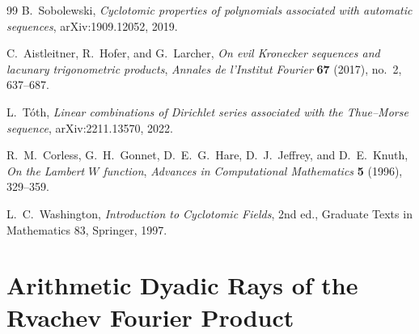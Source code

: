 \documentclass[11pt,oneside]{article}
\theoremstyle{definition}
\theoremstyle{remark}
\begin{document}
\begin{thebibliography}{99}
B.~Sobolewski,
\emph{Cyclotomic properties of polynomials associated with automatic sequences},
arXiv:1909.12052, 2019.

C.~Aistleitner, R.~Hofer, and G.~Larcher,
\emph{On evil Kronecker sequences and lacunary trigonometric products},
\emph{Annales de l'Institut Fourier} \textbf{67} (2017), no.~2, 637--687.

L.~T\'oth,
\emph{Linear combinations of Dirichlet series associated with the Thue--Morse sequence},
arXiv:2211.13570, 2022.

R.~M.~Corless, G.~H.~Gonnet, D.~E.~G.~Hare, D.~J.~Jeffrey, and D.~E.~Knuth,
\emph{On the Lambert $W$ function},
\emph{Advances in Computational Mathematics} \textbf{5} (1996), 329--359.

L.~C.~Washington,
\emph{Introduction to Cyclotomic Fields}, 2nd ed.,
Graduate Texts in Mathematics 83, Springer, 1997.

\end{thebibliography}


\newcommand{\importedPartx}{\textcolor{importblue}{\textsc{Imported result.}}}

\setcounter{section}{0}
\renewcommand{\thesection}{\arabic{section}}
\part{Arithmetic Dyadic Rays of the Rvachev Fourier Product}
\end{document}
